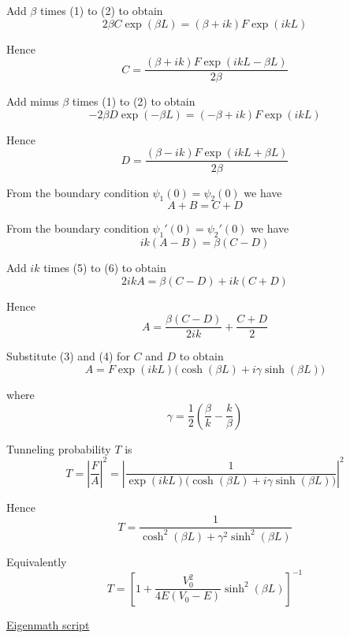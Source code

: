 Add $\beta$ times (1) to (2) to obtain
\begin{equation*}
2\beta C\exp(\beta L)=(\beta+ik)F\exp(ikL)
\end{equation*}

Hence
\begin{equation*}
C=\frac{(\beta+ik)F\exp(ikL-\beta L)}{2\beta}
\tag{3}
\end{equation*}

Add minus $\beta$ times (1) to (2) to obtain
\begin{equation*}
-2\beta D\exp(-\beta L)=(-\beta+ik)F\exp(ikL)
\end{equation*}

Hence
\begin{equation*}
D=\frac{(\beta-ik)F\exp(ikL+\beta L)}{2\beta}
\tag{4}
\end{equation*}

From the boundary condition $\psi_1(0)=\psi_2(0)$ we have
\begin{equation*}
A+B=C+D
\tag{5}
\end{equation*}

From the boundary condition $\psi_1'(0)=\psi_2'(0)$ we have
\begin{equation*}
ik(A-B)=\beta(C-D)
\tag{6}
\end{equation*}

Add $ik$ times (5) to (6) to obtain
\begin{equation*}
2ikA=\beta(C-D)+ik(C+D)
\end{equation*}

Hence
\begin{equation*}
A=\frac{\beta(C-D)}{2ik}+\frac{C+D}{2}
\end{equation*}

Substitute (3) and (4) for $C$ and $D$ to obtain
\begin{equation*}
A = F\exp(ikL)\bigl(\cosh(\beta L)+i\gamma\sinh(\beta L)\bigr)
\tag{7}
\end{equation*}

where
\begin{equation*}
\gamma=\frac{1}{2}\left(\frac{\beta}{k}-\frac{k}{\beta}\right)
\end{equation*}

Tunneling probability $T$ is
\begin{equation*}
T=\left|\frac{F}{A}\right|^2
=\left|\frac{1}{\exp(ikL)\bigl(\cosh(\beta L)+i\gamma\sinh(\beta L)\bigr)}\right|^2
\end{equation*}

Hence
\begin{equation*}
T=\frac{1}{\cosh^2(\beta L)+\gamma^2\sinh^2(\beta L)}
\tag{8}
\end{equation*}

Equivalently
\begin{equation*}
T=\left[1+\frac{V_0^2}{4E(V_0-E)}\sinh^2(\beta L)\right]^{-1}
\tag{9}
\end{equation*}

\href{https://georgeweigt.github.io/examples/wkb-method-part-2-demo.html}{Eigenmath script}


